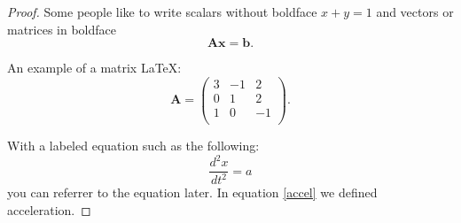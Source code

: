\documentclass[11pt]{article}
\begin{document}
\begin{enumerate}
\begin{proof}
Some people like to write scalars without boldface $x+y=1$ and vectors or matrices in boldface
\begin{equation}
    \mathbf{A} \mathbf{x} = \mathbf{b}.
\end{equation}

An example of a matrix \LaTeX:
\begin{equation}
    \mathbf{A} = \left(
    \begin{array}{ccc}
    3 & -1 & 2 \\ 	
    0 & 1 & 2 \\ 
    1 & 0 & -1 \\
\end{array} 
\right).  
\end{equation}

With a labeled equation such as the following:
\begin{equation}
    \label{accel}
    \frac{d^2 x}{d t^2} = a
\end{equation}
you can referrer to the equation later. In equation \ref{accel} we defined acceleration.

\end{proof}



\end{enumerate}
\end{document}
